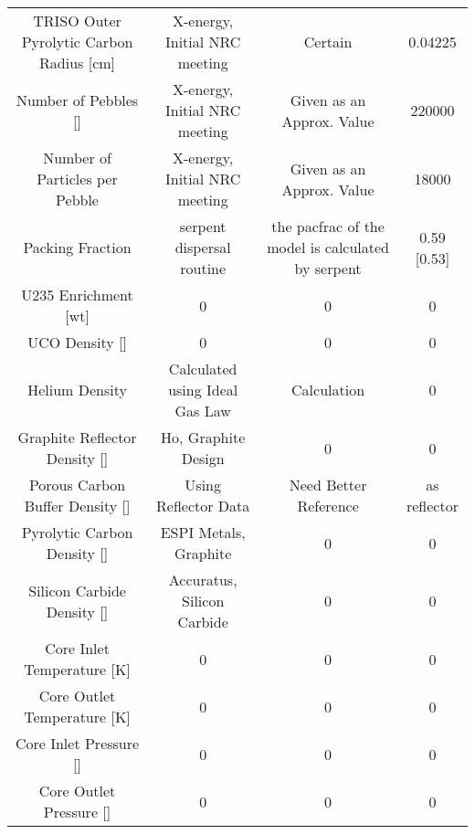 \documentclass[letterpaper]{article}
\begin{document}
\begin{adjustbox}{max width=\textwidth}
\begin{tabular}{c c c c}
 TRISO Outer Pyrolytic Carbon Radius [cm] & X-energy, Initial NRC meeting & Certain & 0.04225 \\

 Number of Pebbles [] & X-energy, Initial NRC meeting & Given as an Approx. Value & 220000 \\

 Number of Particles per Pebble & X-energy, Initial NRC meeting & Given as an Approx. Value & 18000 \\

 Packing Fraction & serpent dispersal routine & the pacfrac of the model is calculated by serpent & 0.59 [0.53] \\

 U235 Enrichment [wt] & 0 & 0 & 0 \\

 UCO Density [] & 0 & 0 & 0 \\

 Helium Density & Calculated using Ideal Gas Law & Calculation & 0 \\

 Graphite Reflector Density [] & Ho, Graphite Design & 0 & 0 \\

 Porous Carbon Buffer Density [] & Using Reflector Data & Need Better Reference & as reflector \\

 Pyrolytic Carbon Density [] & ESPI Metals, Graphite & 0 & 0 \\

 Silicon Carbide Density [] & Accuratus, Silicon Carbide & 0 & 0 \\

 Core Inlet Temperature [K] & 0 & 0 & 0 \\

 Core Outlet Temperature [K] & 0 & 0 & 0 \\

 Core Inlet Pressure [] & 0 & 0 & 0 \\

 Core Outlet Pressure [] & 0 & 0 & 0 \\



 \end{tabular}
\end{adjustbox}
\end{document}
